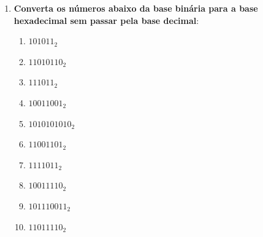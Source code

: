 \begin{enumerate}
    \item \textbf{Converta os números abaixo da base binária para a base hexadecimal sem passar pela base decimal}:

          \begin{enumerate}
              \item $101011_{2}$
              \item $11010110_{2}$
              \item $111011_{2}$
              \item $10011001_{2}$
              \item $1010101010_{2}$
              \item $11001101_{2}$
              \item $1111011_{2}$
              \item $10011110_{2}$
              \item $101110011_{2}$
              \item $11011110_{2}$
          \end{enumerate}



\end{enumerate}
